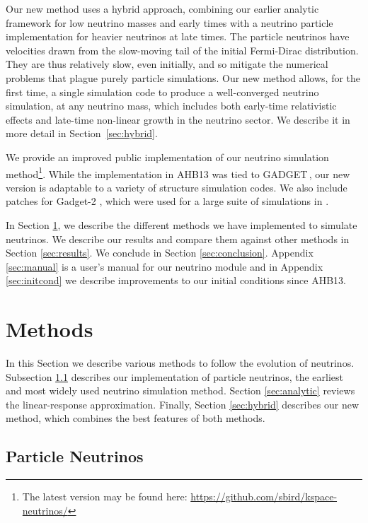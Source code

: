 \documentclass[useAMS, usenatbib]{mnras}
\newcommand{\gadget}{{\small GADGET\,}}
\begin{document}
Our new method uses a hybrid approach, combining our earlier analytic framework for low neutrino masses and early times with a neutrino particle implementation for
heavier neutrinos at late times. The particle neutrinos have velocities drawn from the slow-moving tail of the initial Fermi-Dirac distribution. They are thus relatively slow,
even initially, and so mitigate the numerical problems that plague purely particle simulations. Our new method allows, for the first time, a single simulation code to produce a well-converged neutrino simulation, at any neutrino mass, which includes both early-time relativistic effects and late-time non-linear growth in the neutrino sector. We describe it in more detail in Section~\ref{sec:hybrid}.

We provide an improved public implementation of our neutrino simulation
method\footnote{The latest version may be found here: \url{https://github.com/sbird/kspace-neutrinos/}}.
While the implementation in AHB13 was tied to \gadget \citep{Springel_2005}, our new version is adaptable to a variety of structure simulation codes. We also include patches for Gadget-2 \citep{Springel_2005}, which were used for a large suite of simulations in \cite{Liu_2017}.

In Section \ref{sec:methods}, we describe the different methods we have implemented to simulate neutrinos. We describe our
results and compare them against other methods in Section \ref{sec:results}. We conclude in Section \ref{sec:conclusion}. Appendix \ref{sec:manual} is a user's manual for our neutrino module and in Appendix \ref{sec:initcond} we describe improvements to our initial conditions since AHB13.

\section{Methods}
\label{sec:methods}

In this Section we describe various methods to follow the evolution of neutrinos. Subsection \ref{sec:particle} describes our implementation of particle neutrinos, the earliest and most widely used neutrino simulation method. Section \ref{sec:analytic} reviews the linear-response approximation. Finally, Section \ref{sec:hybrid} describes our new method, which combines the best features of both methods.


\subsection{Particle Neutrinos}
\label{sec:particle}
\end{document}
